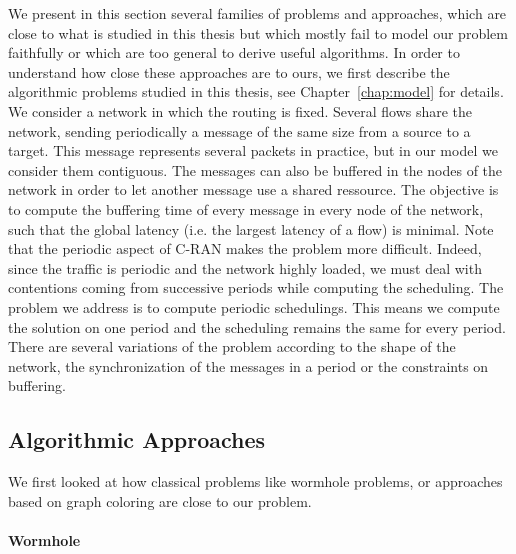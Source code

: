  We present in this section several families of problems and approaches, which are close to what is studied in this thesis but which mostly fail to model our problem faithfully or which are too general to derive useful algorithms. In order to understand how close these approaches are to ours, we first describe the algorithmic problems studied in this thesis, see Chapter~\ref{chap:model} for details. We consider a network in which the routing is fixed. Several flows share the network, sending periodically a message of the same size from a source to a target. This message represents several packets in practice, but in our model we consider them contiguous. The messages can also be buffered in the nodes of the network in order to let another message use a shared ressource. The objective is to compute the buffering time of every message in every node of the network, such that the global latency (i.e. the largest latency of a flow) is minimal. Note that the periodic aspect of C-RAN makes the problem more difficult. Indeed, since the traffic is periodic and the network highly loaded, we must deal with contentions coming from successive periods while computing the scheduling. The problem we address is to compute periodic schedulings. This means we compute the solution on one period and the scheduling remains the same for every period.
 There are several variations of the problem according to the shape of the network, the synchronization of the messages in a period or the constraints on buffering.
 

\subsection{Algorithmic Approaches}
We first looked at how classical problems like wormhole problems, or approaches based on graph coloring are close to our problem.

\paragraph{Wormhole}

